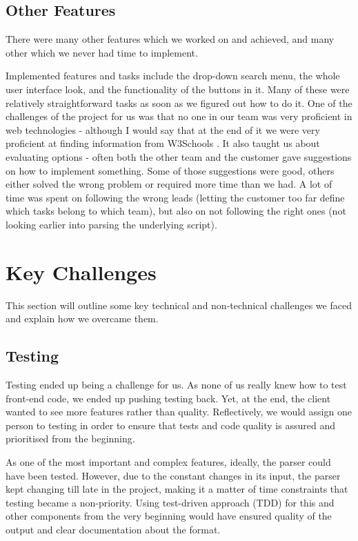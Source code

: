 \documentclass{l3proj}
\begin{document}
\subsection{Other Features}

There were many other features which we worked on and achieved, and many other which we never had time to implement.

Implemented features and tasks include the drop-down search menu, the whole user interface look, and the functionality of the buttons in it. Many of these were relatively straightforward tasks as soon as we figured out how to do it. One of the challenges of the project for us was that no one in our team was very proficient in web technologies - although I would say that at the end of it we were very proficient at finding information from W3Schools \cite{w3schools}. It also taught us about evaluating options - often both the other team and the customer gave suggestions on how to implement something. Some of those suggestions were good, others either solved the wrong problem or required more time than we had. A lot of time was spent on following the wrong leads (letting the customer too far define which tasks belong to which team), but also on not following the right ones (not looking earlier into parsing the underlying script). 



\section{Key Challenges}
\label{sec:managing}

This section will outline some key technical and non-technical challenges we faced and explain how we overcame them.

\subsection{Testing}
\label{subsec:testing}
Testing ended up being a challenge for us. As none of us really knew how to test front-end code, we ended up pushing testing back. Yet, at the end, the client wanted to see more features rather than quality. Reflectively, we would assign one person to testing in order to ensure that tests and code quality is assured and prioritised from the beginning.   

As one of the most important and complex features, ideally, the parser could have been tested. However, due to the constant changes in its input, the parser kept changing till late in the project, making it a matter of time constraints that testing became a non-priority. Using test-driven approach (TDD) for this and other components from the very beginning would have ensured quality of the output and clear documentation about the format.
\end{document}
